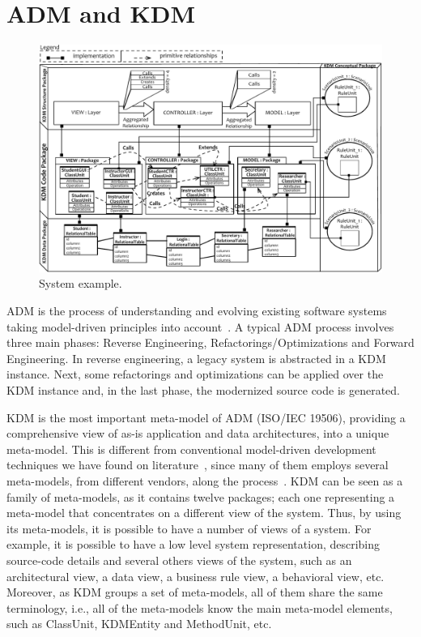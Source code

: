 
\section{ADM and KDM} %
\label{sec:background}
 
\begin{figure}[t]
	\centering
	\includegraphics[scale=0.8]{figuras/NovoSystem4}
	\caption{System example.}
	\label{fig:system}
\end{figure}

ADM is the process of understanding  and evolving existing software systems taking model-driven principles into account~\cite{1686216}. A typical ADM process involves three main phases: Reverse Engineering, Refactorings/Optimizations and Forward Engineering. In reverse engineering, a legacy system is abstracted in a KDM instance. Next, some refactorings and optimizations can be applied over the KDM instance and, in the last phase, the modernized source code is generated. 

KDM is the most important meta-model of ADM (ISO/IEC 19506), providing a comprehensive view of as-is application and data architectures, into a unique meta-model. This is different from conventional model-driven development techniques we have found on literature~\cite{7051941}, since many of them employs several meta-models, from different vendors, along the process~\cite{Perez-Castillo:2011:KDM}. KDM can be seen as a family of meta-models, as it contains twelve packages; each one representing a meta-model that concentrates on a different view of the system. Thus, by using its  meta-models, it is possible to have a number of views of a system. For example, it is possible to have a low level system representation, describing source-code details and several others views of the system, such as an architectural view, a data view, a business rule view, a behavioral view, etc. Moreover, as KDM groups a set of meta-models, all of them share the same terminology, i.e., all of the meta-models know the main meta-model elements, such as ClassUnit, KDMEntity and MethodUnit, etc.

